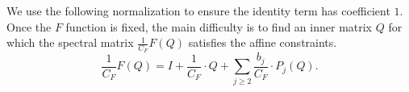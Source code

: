 \documentclass[12pt]{article}
\newcommand{\Authornote}[3]{{\sf\footnotesize\color{#3}{[#1: #2]}}}
\newcommand{\Authornote}[3]{}
\newcommand{\jnote}[1]{\Authornote{Jeff}{#1}{blue}}
\newcommand{\anote}[1]{\Authornote{Aaron}{#1}{cyan}}
\begin{document}
  We use the following normalization to ensure the identity term has coefficient $1$. Once the $F$ function is fixed, the main difficulty is to find an inner matrix \(Q\) for which the spectral
matrix \(\frac1{C_F}F(  Q)\) satisfies the affine constraints. 
%
\[
    \frac{1}{C_F}F( Q)
    =
    I+\frac{1}{C_F}\cdot Q +\sum_{j\ge2}   \frac{b_j}{C_F}\cdot  P_j(  Q).
\]
\end{document}
